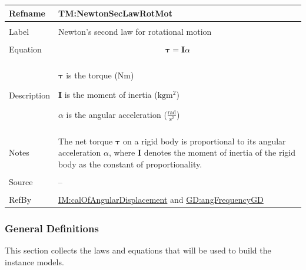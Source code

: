 \documentclass[12pt]{article}
\begin{document}
\begin{minipage}{\textwidth}
\begin{tabular}{>{\raggedright}p{}>{\raggedright\arraybackslash}p{}}
\toprule \textbf{Refname} & \textbf{TM:NewtonSecLawRotMot}
\label{TM:NewtonSecLawRotMot}
\\ \midrule \\
Label & Newton's second law for rotational motion
        
\\ \midrule \\
Equation & \begin{displaymath}
           \symbf{τ}=\symbf{I} α
           \end{displaymath}
\\ \midrule \\
Description & \begin{symbDescription}
              \item{$\symbf{τ}$ is the torque ($\text{N}\text{m}$)}
              \item{$\symbf{I}$ is the moment of inertia ($\text{kg}\text{m}^{2}$)}
              \item{$α$ is the angular acceleration ($\frac{\text{rad}}{\text{s}^{2}}$)}
              \end{symbDescription}
\\ \midrule \\
Notes & The net torque $\symbf{τ}$ on a rigid body is proportional to its angular acceleration $α$, where $\symbf{I}$ denotes the moment of inertia of the rigid body as the constant of proportionality.
        
\\ \midrule \\
Source & --
         
\\ \midrule \\
RefBy & \hyperref[IM:calOfAngularDisplacement]{IM:calOfAngularDisplacement} and \hyperref[GD:angFrequencyGD]{GD:angFrequencyGD}
        
\\ \bottomrule
\end{tabular}
\end{minipage}
\subsubsection{General Definitions}
\label{Sec:GDs}
This section collects the laws and equations that will be used to build the instance models.
\end{document}

